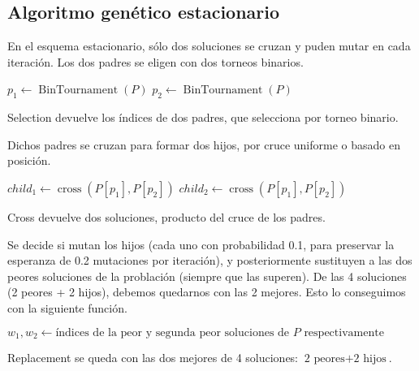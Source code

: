 \documentclass{article}
\begin{document}
\subsection{Algoritmo genético estacionario}

En el esquema estacionario, sólo dos soluciones se cruzan y puden mutar en cada iteración. Los dos padres se eligen con dos
torneos binarios.

\begin{algorithm}[H]
	\DontPrintSemicolon %
	$p_1\gets\operatorname{BinTournament}(P)$\;
	$p_2\gets\operatorname{BinTournament}(P)$\;
	\;
	\caption{{\sc Selection} devuelve los índices de dos padres, que selecciona por torneo binario.}
	\label{alg:selection-stationary}
\end{algorithm}

Dichos padres se cruzan para formar dos hijos, por cruce uniforme o basado en posición.

\begin{algorithm}[H]
	\DontPrintSemicolon %
	$child_1\gets\operatorname{cross}(P[p_1],P[p_2])$\;
	$child_2\gets\operatorname{cross}(P[p_1],P[p_2])$\;
	\;
	\caption{{\sc Cross} devuelve dos soluciones, producto del cruce de los padres.}
	\label{alg:cross-stationary}
\end{algorithm}

Se decide si mutan los hijos (cada uno con probabilidad 0.1, para preservar la esperanza de 0.2 mutaciones por iteración), y posteriormente sustituyen a las dos peores soluciones de la problación (siempre que las superen).
De las 4 soluciones (2 peores + 2 hijos), debemos quedarnos con las 2 mejores. Esto lo conseguimos con la siguiente función.

\begin{algorithm}[H]
	\DontPrintSemicolon %
	$w_1,w_2\gets\text{índices de la peor y segunda peor soluciones de $P$ respectivamente}$\;
	\caption{{\sc Replacement} se queda con las dos mejores de 4 soluciones: $\text{2 peores} + \text{2 hijos}$.}
	\label{alg:replacement-stationary}
\end{algorithm}
\end{document}
